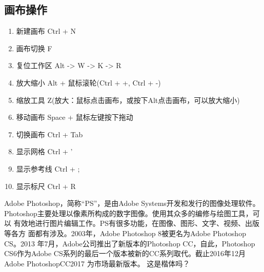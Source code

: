  \subsection{画布操作}
 \begin{enumerate}
 	\item 新建画布 \tab Ctrl + N
 	\item 画布切换 \tab F
 	\item 复位工作区 \tab Alt -> W -> K -> R
 	\item 放大缩小 \tab Alt + 鼠标滚轮(Ctrl + +, Ctrl + -)
 	\item 缩放工具 \tab Z(放大：鼠标点击画布，或按下Alt点击画布，可以放大缩小)
 	\item 移动画布 \tab Space + 鼠标左键按下拖动
 	\item 切换画布 \tab Ctrl + Tab
 	\item 显示网格 \tab Ctrl + '
 	\item 显示参考线 \tab Ctrl + ;
 	\item 显示标尺 \tab Ctrl + R
 \end{enumerate}
  Adobe Photoshop，简称“PS”，是由Adobe Systems开发和发行的图像处理软件。
 Photoshop主要处理以像素所构成的数字图像。使用其众多的编修与绘图工具，可以
 有效地进行图片编辑工作。PS有很多功能，在图像、图形、文字、视频、出版等各方
 面都有涉及。2003年，Adobe Photoshop 8被更名为Adobe Photoshop CS。2013
 年7月，Adobe公司推出了新版本的Photoshop CC，自此，Photoshop CS6作为Adobe
 CS系列的最后一个版本被新的CC系列取代。截止2016年12月Adobe PhotoshopCC2017
 为市场最新版本。
 {\kaishu 这是楷体吗？}
 
